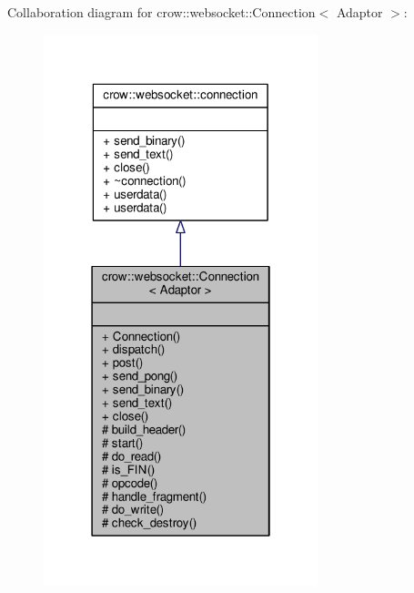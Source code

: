 Collaboration diagram for crow\-:\-:websocket\-:\-:Connection$<$ Adaptor $>$\-:
\nopagebreak
\begin{figure}[H]
\begin{center}
\leavevmode
\includegraphics[width=226pt]{classcrow_1_1websocket_1_1_connection__coll__graph}
\end{center}
\end{figure}
